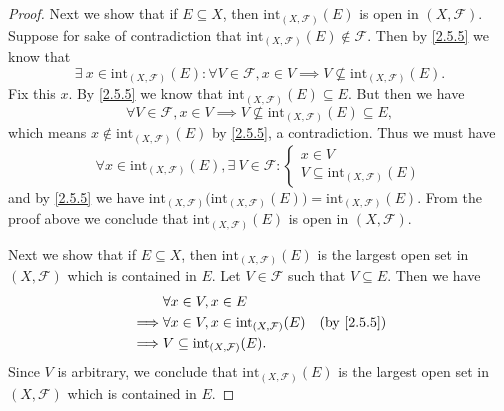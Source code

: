 \begin{proof}
  Next we show that if \(E \subseteq X\), then \(\text{int}_{(X, \mathcal{F})}(E)\) is open in \((X, \mathcal{F})\).
  Suppose for sake of contradiction that \(\text{int}_{(X, \mathcal{F})}(E) \notin \mathcal{F}\).
  Then by \cref{2.5.5} we know that
  \[
    \exists\ x \in \text{int}_{(X, \mathcal{F})}(E) : \forall V \in \mathcal{F}, x \in V \implies V \not\subseteq \text{int}_{(X, \mathcal{F})}(E).
  \]
  Fix this \(x\).
  By \cref{2.5.5} we know that \(\text{int}_{(X, \mathcal{F})}(E) \subseteq E\).
  But then we have
  \[
    \forall V \in \mathcal{F}, x \in V \implies V \not\subseteq \text{int}_{(X, \mathcal{F})}(E) \subseteq E,
  \]
  which means \(x \notin \text{int}_{(X, \mathcal{F})}(E)\) by \cref{2.5.5}, a contradiction.
  Thus we must have
  \[
    \forall x \in \text{int}_{(X, \mathcal{F})}(E), \exists\ V \in \mathcal{F} : \begin{cases}
      x \in V \\
      V \subseteq \text{int}_{(X, \mathcal{F})}(E)
    \end{cases}
  \]
  and by \cref{2.5.5} we have \(\text{int}_{(X, \mathcal{F})}\big(\text{int}_{(X, \mathcal{F})}(E)\big) = \text{int}_{(X, \mathcal{F})}(E)\).
  From the proof above we conclude that \(\text{int}_{(X, \mathcal{F})}(E)\) is open in \((X, \mathcal{F})\).

  Next we show that if \(E \subseteq X\), then \(\text{int}_{(X, \mathcal{F})}(E)\) is the largest open set in \((X, \mathcal{F})\) which is contained in \(E\).
  Let \(V \in \mathcal{F}\) such that \(V \subseteq E\).
  Then we have
  \begin{align*}
             & \forall x \in V, x \in E                                                           \\
    \implies & \forall x \in V, x \in \text{int}_{(X, \mathcal{F})}(E) & \text{(by \cref{2.5.5})} \\
    \implies & V \subseteq \text{int}_{(X, \mathcal{F})}(E).
  \end{align*}
  Since \(V\) is arbitrary, we conclude that \(\text{int}_{(X, \mathcal{F})}(E)\) is the largest open set in \((X, \mathcal{F})\) which is contained in \(E\).


\end{proof}
